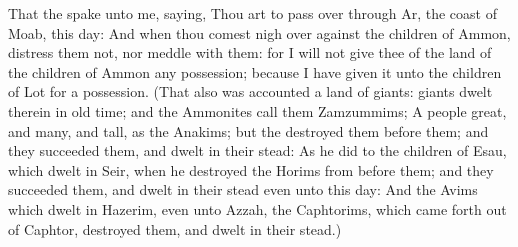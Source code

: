 \begin{biblechapter}
\verse That the \LORD spake unto me, saying,
\verse Thou art to pass over through Ar, the coast of Moab, this day:
\verse And when thou comest nigh over against the children of Ammon, distress them not, nor meddle with them: for I will not give thee of the land of the children of Ammon any possession; because I have given it unto the children of Lot for a possession.
\verse (That also was accounted a land of giants: giants dwelt therein in old time; and the Ammonites call them Zamzummims;
\verse A people great, and many, and tall, as the Anakims; but the \LORD destroyed them before them; and they succeeded them, and dwelt in their stead:
\verse As he did to the children of Esau, which dwelt in Seir, when he destroyed the Horims from before them; and they succeeded them, and dwelt in their stead even unto this day:
\verse And the Avims which dwelt in Hazerim, even unto Azzah, the Caphtorims, which came forth out of Caphtor, destroyed them, and dwelt in their stead.)

\end{biblechapter}
